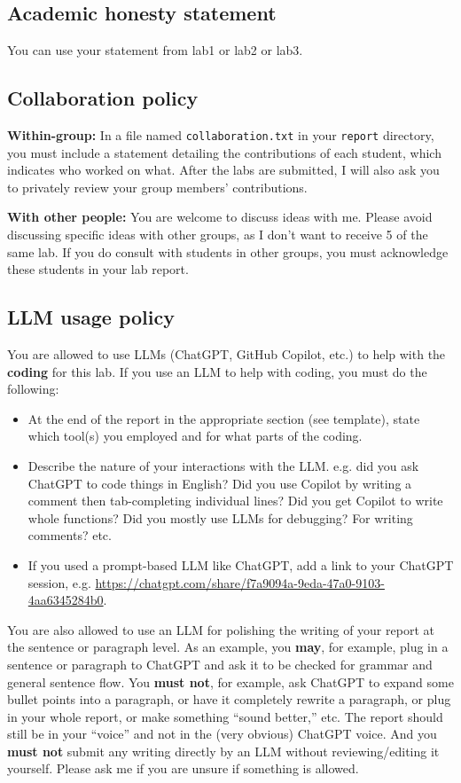 \documentclass[letterpaper,12pt]{article}
\begin{document}
\subsection{Academic honesty statement}

You can use your statement from lab1 or lab2 or lab3.

\subsection{Collaboration policy}

\textbf{Within-group:} In a file named \texttt{collaboration.txt} in your \texttt{report} directory, you must include a statement detailing the contributions of each student, which indicates who worked on what. After the labs are submitted, I will also ask you to privately review your group members' contributions.

\textbf{With other people:} You are welcome to discuss ideas with me. Please avoid discussing specific ideas with other groups, as I don't want to receive 5 of the same lab. If you do consult with students in other groups, you must acknowledge these students in your lab report.

\subsection{LLM usage policy}

You are allowed to use LLMs (ChatGPT, GitHub Copilot, etc.) to help with the \textbf{coding} for this lab.  If you use an LLM to help with coding, you must do the following:
\begin{itemize}
    \item At the end of the report in the appropriate section (see template), state which tool(s) you employed and for what parts of the coding.
    \item Describe the nature of your interactions with the LLM. e.g. did you ask ChatGPT to code things in English? Did you use Copilot by writing a comment then tab-completing individual lines? Did you get Copilot to write whole functions? Did you mostly use LLMs for debugging? For writing comments? etc.
    \item If you used a prompt-based LLM like ChatGPT, add a link to your ChatGPT session, e.g. \url{https://chatgpt.com/share/f7a9094a-9eda-47a0-9103-4aa6345284b0}.
\end{itemize}

You are also allowed to use an LLM for polishing the writing of your report at the sentence or paragraph level. As an example, you \textbf{may}, for example, plug in a sentence or paragraph to ChatGPT and ask it to be checked for grammar and general sentence flow. You \textbf{must not}, for example, ask ChatGPT to expand some bullet points into a paragraph, or have it completely rewrite a paragraph, or plug in your whole report, or make something ``sound better,'' etc. The report should still be in your ``voice'' and not in the (very obvious) ChatGPT voice. And you \textbf{must not} submit any writing directly by an LLM without reviewing/editing it yourself. Please ask me if you are unsure if something is allowed.
\end{document}
